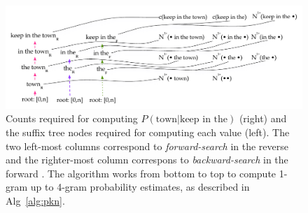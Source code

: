 \begin{figure}[p]
\includegraphics[width=\textwidth]{figures/kn_dual_cst}
\vspace{-3ex}
\caption{Counts required for computing $P(\text{town} | \text{keep in the})$ (right) and the suffix tree nodes required for computing each value (left). The two left-most columns correspond to \emph{forward-search} in the reverse \CST and the righter-most column correspons to \emph{backward-search} in the forward \CST. The algorithm works from bottom to top to compute 1-gram up to 4-gram probability estimates, as described in Alg~\ref{alg:pkn}.}
\label{fig-counts-example}
\end{figure}

